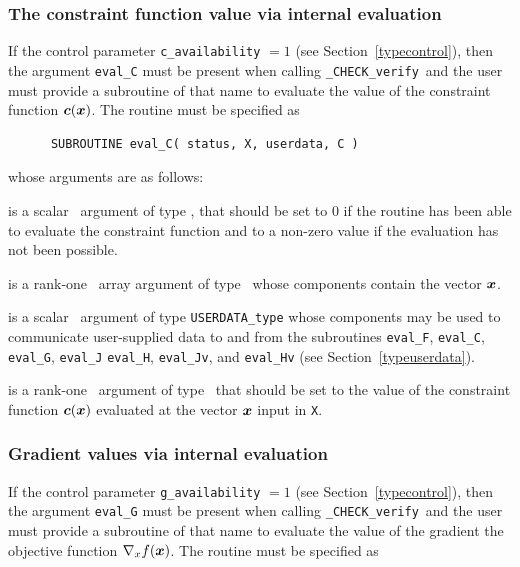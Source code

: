 \documentclass{galahad}
\newcommand{\packagename}{CHECK}
\newcommand{\fullpackagename}{\libraryname\_\packagename}
\newcommand{\solver}{{\tt \fullpackagename\_verify}}
\begin{document}
\subsubsection{The constraint function value via internal evaluation\label{cfv}}

If the control parameter {\tt c\_availability} $=1$ (see
Section~\ref{typecontrol}), then the argument
{\tt eval\_C} must be present when calling \solver\ and the
user must provide a subroutine of that name to evaluate the
value of the constraint function ${\bm{c}}({\bm{x}})$.
The routine must be specified as

\def\baselinestretch{0.8}
{\tt \begin{verbatim}
      SUBROUTINE eval_C( status, X, userdata, C ) \end{verbatim} }
\def\baselinestretch{1.0}
\noindent whose arguments are as follows:

\begin{description}
 is a scalar \intentout\ argument of type \integer,
that should be set to 0 if the routine has been able to evaluate 
the constraint function
and to a non-zero value if the evaluation has not been possible.

 is a rank-one \intentin\ array argument of type \realdp\
whose components contain the vector ${\bm{x}}$.

 is a scalar \intentinout\ argument of type 
{\tt USERDATA\_type} whose components may be used
to communicate user-supplied data to and from the
subroutines {\tt eval\_F}, {\tt eval\_C}, {\tt eval\_G}, {\tt eval\_J}
{\tt eval\_H}, {\tt eval\_Jv}, and {\tt eval\_Hv} 
(see Section~\ref{typeuserdata}). 

 is a rank-one \intentout\ argument of type \realdp\
that should be set to the value of the constraint function ${\bm{c}}({\bm{x}})$
evaluated at the vector ${\bm{x}}$ input in {\tt X}.

\end{description}


\subsubsection{Gradient values via internal evaluation\label{gfv}}

If the control parameter {\tt g\_availability} $=1$ (see
Section~\ref{typecontrol}), then the argument {\tt eval\_G} must be
present when calling \solver\ and the
user must provide a subroutine of that name to evaluate the
value of the gradient the objective function $\nabla_x f({\bm{x}})$.
The routine must be specified as
\end{document}
